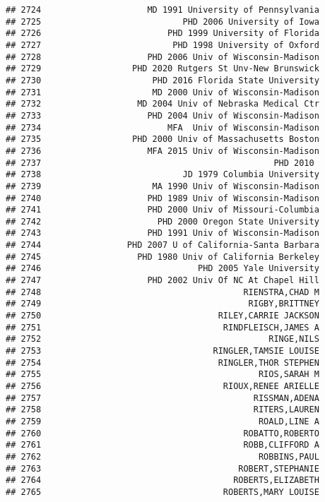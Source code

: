 \documentclass[
]{article}
\begin{document}
\begin{verbatim}
## 2724                     MD 1991 University of Pennsylvania
## 2725                            PHD 2006 University of Iowa
## 2726                         PHD 1999 University of Florida
## 2727                          PHD 1998 University of Oxford
## 2728                     PHD 2006 Univ of Wisconsin-Madison
## 2729                  PHD 2020 Rutgers St Unv-New Brunswick
## 2730                      PHD 2016 Florida State University
## 2731                      MD 2000 Univ of Wisconsin-Madison
## 2732                   MD 2004 Univ of Nebraska Medical Ctr
## 2733                     PHD 2004 Univ of Wisconsin-Madison
## 2734                         MFA  Univ of Wisconsin-Madison
## 2735                  PHD 2000 Univ of Massachusetts Boston
## 2736                     MFA 2015 Univ of Wisconsin-Madison
## 2737                                              PHD 2010 
## 2738                            JD 1979 Columbia University
## 2739                      MA 1990 Univ of Wisconsin-Madison
## 2740                     PHD 1989 Univ of Wisconsin-Madison
## 2741                     PHD 2000 Univ of Missouri-Columbia
## 2742                       PHD 2000 Oregon State University
## 2743                     PHD 1991 Univ of Wisconsin-Madison
## 2744                 PHD 2007 U of California-Santa Barbara
## 2745                   PHD 1980 Univ of California Berkeley
## 2746                               PHD 2005 Yale University
## 2747                     PHD 2002 Univ Of NC At Chapel Hill
## 2748                                        RIENSTRA,CHAD M
## 2749                                         RIGBY,BRITTNEY
## 2750                                   RILEY,CARRIE JACKSON
## 2751                                    RINDFLEISCH,JAMES A
## 2752                                             RINGE,NILS
## 2753                                  RINGLER,TAMSIE LOUISE
## 2754                                   RINGLER,THOR STEPHEN
## 2755                                           RIOS,SARAH M
## 2756                                    RIOUX,RENEE ARIELLE
## 2757                                          RISSMAN,ADENA
## 2758                                          RITERS,LAUREN
## 2759                                           ROALD,LINE A
## 2760                                        ROBATTO,ROBERTO
## 2761                                        ROBB,CLIFFORD A
## 2762                                           ROBBINS,PAUL
## 2763                                       ROBERT,STEPHANIE
## 2764                                      ROBERTS,ELIZABETH
## 2765                                    ROBERTS,MARY LOUISE

\end{verbatim}
\end{document}
